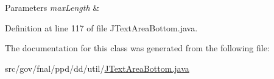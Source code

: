 \begin{DoxyParams}{Parameters}
{\em max\-Length} & \\
\hline
\end{DoxyParams}


Definition at line 117 of file J\-Text\-Area\-Bottom.\-java.



The documentation for this class was generated from the following file\-:\begin{DoxyCompactItemize}
\item 
src/gov/fnal/ppd/dd/util/\hyperlink{JTextAreaBottom_8java}{J\-Text\-Area\-Bottom.\-java}\end{DoxyCompactItemize}
